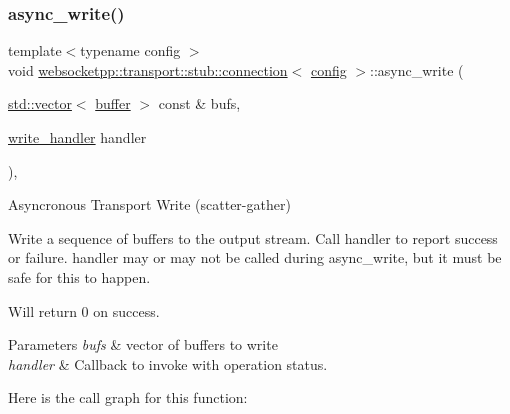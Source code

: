 \subsubsection{\texorpdfstring{async\+\_\+write()}{async\_write()}\hspace{0.1cm}{\footnotesize\ttfamily [2/2]}}
{\footnotesize\ttfamily template$<$typename config $>$ \\
void \mbox{\hyperlink{classwebsocketpp_1_1transport_1_1stub_1_1connection}{websocketpp\+::transport\+::stub\+::connection}}$<$ \mbox{\hyperlink{classconfig}{config}} $>$\+::async\+\_\+write (\begin{DoxyParamCaption}\item[{\mbox{\hyperlink{classstd_1_1vector}{std\+::vector}}$<$ \mbox{\hyperlink{structwebsocketpp_1_1transport_1_1buffer}{buffer}} $>$ const \&}]{bufs,  }\item[{\mbox{\hyperlink{namespacewebsocketpp_1_1transport_addf5d728159e7aa2bce2a0df947b1560}{write\+\_\+handler}}}]{handler }\end{DoxyParamCaption})\hspace{0.3cm}{\ttfamily [inline]}, {\ttfamily [protected]}}



Asyncronous Transport Write (scatter-\/gather) 

Write a sequence of buffers to the output stream. Call handler to report success or failure. handler may or may not be called during async\+\_\+write, but it must be safe for this to happen.

Will return 0 on success.


\begin{DoxyParams}{Parameters}
{\em bufs} & vector of buffers to write \\
\hline
{\em handler} & Callback to invoke with operation status. \\
\hline
\end{DoxyParams}
Here is the call graph for this function\+:
\mbox{\label{classwebsocketpp_1_1transport_1_1stub_1_1connection_a8a02eae7fd9209b0c953feb931dc781c}} 
